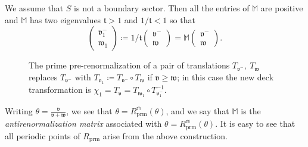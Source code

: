 \documentclass{amsart}
\newcommand{\1}{{\mathbb 1 }}
\newcommand\M{\mathbb M}
\newcommand\prm{{\operatorname{prm}}}
\newcommand\cRRc{R_{\prm}}%
\newcommand{\mm}{\mathbb{m}}
\newcommand{\vv}{\mathfrak{v}}
\newcommand{\ww}{\mathfrak{w}}
\renewcommand{\tt}{\mathfrak{t}}
\theoremstyle{remark}
\numberwithin{equation}{section}
\theoremstyle{definition}
\theoremstyle{nonumberbreak}
\begin{document}
        
We assume that $S$ is not a boundary sector. Then all the entries of $\M$ are positive and $\M$ has two eigenvalues $\tt>1$ and $1/\tt<1$ so that
\begin{equation}
\label{eq:vv1 ww1}
 \left(\begin{matrix}
        \vv^-_1 \\
  \ww_1
        \end{matrix} \right) \coloneqq 1/\tt\left(\begin{matrix}
        \vv^- \\ \ww
        \end{matrix}\right) = \M \left(\begin{matrix}
        \vv^- \\ \ww
        \end{matrix}\right) .
  \end{equation}      


 
 

\begin{figure}[tp!]
\caption{The prime pre-renormalization of a pair of translations $T_{\vv^-},~T_{\ww}$ replaces $T_{\vv^-}$ with $T_{\vv_1}\coloneqq T_{\vv^-}\circ T_{\ww}$ if $\vv\ge \ww$; in this case the new deck transformation is $\chi_1=T_{\vv}=T_{\ww_1}\circ T_{\vv^-_1}^{-1}$.}
\label{Fig:prime pre ren}
\end{figure}


Writing $\theta=\frac{\vv}{\vv+\ww}$, we see that $\theta =\cRRc^\mm(\theta)$, and we say that $\M$ is the \emph{antirenormalization matrix} associated with $\theta =\cRRc^\mm(\theta)$. It is easy to see that all periodic points of $\cRRc$ arise from the above construction.
\end{document}
